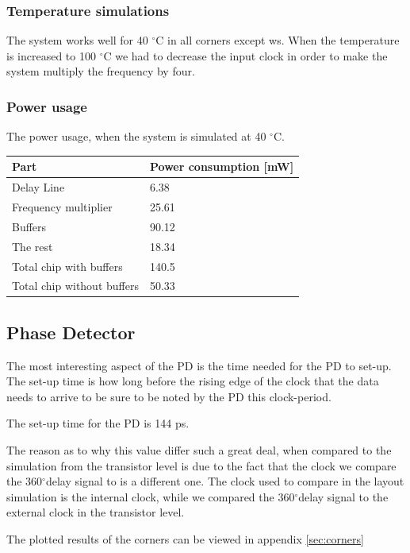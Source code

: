 \documentclass[a4paper,12pt]{article} \usepackage{graphicx}
\newcommand{\degree}{\ensuremath{^\circ}}
\begin{document}
\subsubsection{Temperature simulations}
The system works well for 40 \degree C in all corners except ws.
When the temperature is increased to 100 \degree C we had to decrease 
the input clock in order to make the system multiply the frequency
by four.

\subsubsection{Power usage}
The power usage, when the system is simulated at 40 \degree C.

\begin{tabular}{ l | l }
Part & Power consumption [mW] \\
\hline
Delay Line & 6.38 \\
Frequency multiplier & 25.61 \\
Buffers & 90.12 \\
The rest & 18.34 \\ \hline
Total chip with buffers & 140.5 \\
Total chip without buffers & 50.33
\end{tabular}

\subsection{Phase Detector}
The most interesting aspect of the PD is the time needed for the PD to set-up.
 The set-up time is how long before the rising edge of the clock that the data
 needs to arrive to be sure to be noted by the PD this clock-period.

The set-up time for the PD is 144 ps.

The reason as to why this value differ such a great deal, when compared 
to the simulation from the transistor level is due to the fact that the 
clock we compare the 360\degree delay signal to is a different one.
The clock used to compare in the layout simulation is the internal clock, while 
we compared the 360\degree delay signal to the external clock in the transistor level.

The plotted results of the corners can be viewed in appendix \ref{sec:corners}
\end{document}

